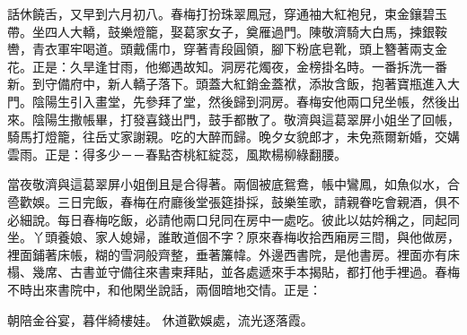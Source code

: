 話休饒舌，又早到六月初八。春梅打扮珠翠鳳冠，穿通袖大紅袍兒，束金鑲碧玉帶。坐四人大轎，鼓樂燈籠，娶葛家女子，奠雁過門。陳敬濟騎大白馬，揀銀鞍轡，青衣軍牢喝道。頭戴儒巾，穿著青段圓領，腳下粉底皂靴，頭上簪著兩支金花。正是：久旱逢甘雨，他鄉遇故知。洞房花燭夜，金榜掛名時。一番拆洗一番新。到守備府中，新人轎子落下。頭蓋大紅銷金蓋袱，添妝含飯，抱著寶瓶進入大門。陰陽生引入畫堂，先參拜了堂，然後歸到洞房。春梅安他兩口兒坐帳，然後出來。陰陽生撒帳畢，打發喜錢出門，鼓手都散了。敬濟與這葛翠屏小姐坐了回帳，騎馬打燈籠，往岳丈家謝親。吃的大醉而歸。晚夕女貌郎才，未免燕爾新婚，交媾雲雨。正是：得多少－－春點杏桃紅綻蕊，風欺楊柳綠翻腰。

當夜敬濟與這葛翠屏小姐倒且是合得著。兩個被底鴛鴦，帳中鸞鳳，如魚似水，合巹歡娛。三日完飯，春梅在府廳後堂張筵掛採，鼓樂笙歌，請親眷吃會親酒，俱不必細說。每日春梅吃飯，必請他兩口兒同在房中一處吃。彼此以姑妗稱之，同起同坐。丫頭養娘、家人媳婦，誰敢道個不字？原來春梅收拾西廂房三間，與他做房，裡面鋪著床帳，糊的雪洞般齊整，垂著簾幃。外邊西書院，是他書房。裡面亦有床榻、幾席、古書並守備往來書柬拜貼，並各處遞來手本揭貼，都打他手裡過。春梅不時出來書院中，和他閑坐說話，兩個暗地交情。正是：

朝陪金谷宴，暮伴綺樓娃。
休道歡娛處，流光逐落霞。

